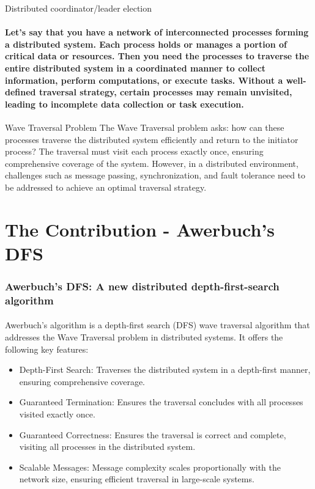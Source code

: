 \documentclass[11pt]{beamer}              %
\begin{document}
\begin{frame}{Distributed coordinator/leader election}
\framesubtitle{Let's say that you have a network of interconnected processes forming a distributed system. Each process holds or manages a portion of critical data or resources. Then you need the processes to traverse the entire distributed system in a coordinated manner to collect information, perform computations, or execute tasks. Without a well-defined traversal strategy, certain processes may remain unvisited, leading to incomplete data collection or task execution.}
\begin{block}{Wave Traversal Problem}
The Wave Traversal problem asks: how can these processes traverse the distributed system efficiently and return to the initiator process?
The traversal must visit each process exactly once, ensuring comprehensive coverage of the system.
However, in a distributed environment, challenges such as message passing, synchronization, and fault tolerance need to be addressed to achieve an optimal traversal strategy.\end{block}
\note{}
\end{frame}

\section{The Contribution - Awerbuch's DFS}
\begin{frame}
\frametitle{Awerbuch's DFS: A new distributed depth-first-search algorithm}
\framesubtitle{}
Awerbuch's algorithm is a depth-first search (DFS) wave traversal algorithm that addresses the Wave Traversal problem in distributed systems. It offers the following key features:
\begin{itemize}
\item Depth-First Search: Traverses the distributed system in a depth-first manner, ensuring comprehensive coverage.
\item Guaranteed Termination: Ensures the traversal concludes with all processes visited exactly once.
\item Guaranteed Correctness: Ensures the traversal is correct and complete, visiting all processes in the distributed system.
\item Scalable Messages: Message complexity scales proportionally with the network size, ensuring efficient traversal in large-scale systems.
\end{itemize}
\end{frame}
\end{document}
